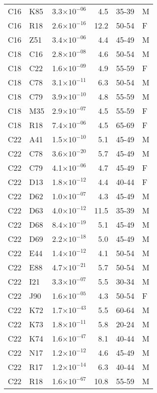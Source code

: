 \begin{longtable}{lllrll}
   C16 & K85 & 3.3$\times10^{-06}$ & 4.5 & 35-39 & M \\ 
   C16 & R18 & 2.6$\times10^{-16}$ & 12.2 & 50-54 & F \\ 
   C16 & Z51 & 3.4$\times10^{-06}$ & 4.4 & 45-49 & M \\ 
   C18 & C16 & 2.8$\times10^{-08}$ & 4.6 & 50-54 & M \\ 
   C18 & C22 & 1.6$\times10^{-09}$ & 4.9 & 55-59 & F \\ 
   C18 & C78 & 3.1$\times10^{-11}$ & 6.3 & 50-54 & M \\ 
   C18 & C79 & 3.9$\times10^{-10}$ & 4.8 & 55-59 & M \\ 
   C18 & M35 & 2.9$\times10^{-07}$ & 4.5 & 55-59 & F \\ 
   C18 & R18 & 7.4$\times10^{-06}$ & 4.5 & 65-69 & F \\ 
   C22 & A41 & 1.5$\times10^{-10}$ & 5.1 & 45-49 & M \\ 
   C22 & C78 & 3.6$\times10^{-20}$ & 5.7 & 45-49 & M \\ 
   C22 & C79 & 4.1$\times10^{-06}$ & 4.7 & 45-49 & F \\ 
   C22 & D13 & 1.8$\times10^{-12}$ & 4.4 & 40-44 & F \\ 
   C22 & D62 & 1.0$\times10^{-07}$ & 4.3 & 45-49 & M \\ 
   C22 & D63 & 4.0$\times10^{-12}$ & 11.5 & 35-39 & M \\ 
   C22 & D68 & 8.4$\times10^{-19}$ & 5.1 & 45-49 & M \\ 
   C22 & D69 & 2.2$\times10^{-18}$ & 5.0 & 45-49 & M \\ 
   C22 & E44 & 1.4$\times10^{-12}$ & 4.1 & 50-54 & M \\ 
   C22 & E88 & 4.7$\times10^{-21}$ & 5.7 & 50-54 & M \\ 
   C22 & I21 & 3.3$\times10^{-07}$ & 5.5 & 30-34 & M \\ 
   C22 & J90 & 1.6$\times10^{-05}$ & 4.3 & 50-54 & F \\ 
   C22 & K72 & 1.7$\times10^{-43}$ & 5.5 & 60-64 & M \\ 
   C22 & K73 & 1.8$\times10^{-11}$ & 5.8 & 20-24 & M \\ 
   C22 & K74 & 1.6$\times10^{-47}$ & 8.1 & 40-44 & M \\ 
   C22 & N17 & 1.2$\times10^{-12}$ & 4.6 & 45-49 & M \\ 
   C22 & R17 & 1.2$\times10^{-14}$ & 6.3 & 40-44 & M \\ 
   C22 & R18 & 1.6$\times10^{-67}$ & 10.8 & 55-59 & M \\ 

\end{longtable}
